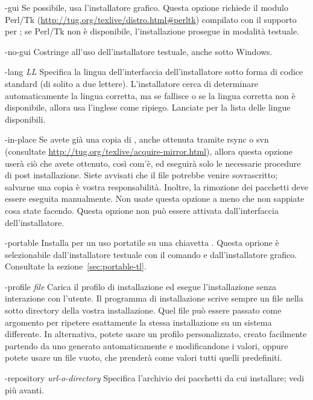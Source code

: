 \documentclass{article}
\begin{document}
\begin{ttdescription}
\item[-gui] Se possibile, usa l'installatore grafico. Questa opzione
  richiede il modulo Perl/Tk
  (\url{http://tug.org/texlive/distro.html#perltk}) compilato con il
  supporto per ; se Perl/Tk non è disponibile, l'installazione
  prosegue in modalità testuale.

\item[-no-gui] Costringe all'uso dell'installatore testuale, anche sotto
  Windows.

\item[-lang {\sl LL}] Specifica la lingua dell'interfaccia
  dell'installatore sotto forma di codice standard (di solito a due
  lettere). L'installatore cerca di determinare automaticamente la lingua
  corretta, ma se fallisce o se la lingua corretta non è disponibile,
  allora usa l'inglese come ripiego. Lanciate 
  per la lista delle lingue disponibili.

\item[-in-place] Se avete già una copia di \TL{}, anche ottenuta tramite
  rsync o svn (consultate \url{http://tug.org/texlive/acquire-mirror.html}),
  allora questa opzione userà ciò che avete ottenuto, così com'è, ed
  eseguirà solo le necessarie procedure di post installazione. Siete
  avvisati che il file  potrebbe venire
  sovrascritto; salvarne una copia è vostra responsabilità. Inoltre, la
  rimozione dei pacchetti deve essere eseguita manualmente. Non usate questa
  opzione a meno che non sappiate cosa state facendo. Questa opzione non può
  essere attivata dall'interfaccia dell'installatore.

\item[-portable] Installa per un uso portatile su una chiavetta \USB{}.
  Questa oprione è selezionabile dall'installatore testuale con il comando
   e dall'installatore grafico. Consultate la
  sezione~\ref{sec:portable-tl}.

\item[-profile {\sl file}] Carica il profilo di installazione  ed
  esegue l'installazione senza interazione con l'utente. Il programma di
  installazione scrive sempre un file  nella sotto
  directory  della vostra installazione. Quel file può essere
  passato come argomento per ripetere esattamente la stessa installazione su
  un sistema differente. In alternativa, potete usare un profilo
  personalizzato, creato facilmente partendo da uno generato automaticamente
  e modificandone i valori, oppure potete usare un file vuoto, che prenderà
  come valori tutti quelli predefiniti.

\item [-repository {\sl url-o-directory}] Specifica l'archivio dei
  pacchetti da cui installare; vedi più avanti.
\end{ttdescription}
\end{document}
